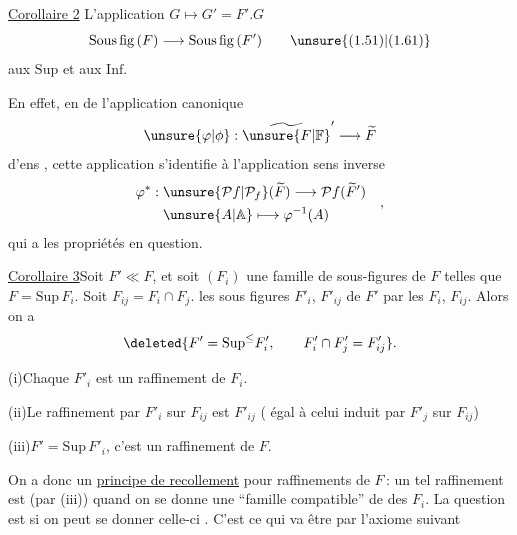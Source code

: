 \uline{Corollaire 2}\quad {} L'application $G\longmapsto G'=F'.G$
\[
\mathrm{Sous\,fig}\,(F)\longrightarrow\mathrm{Sous\,fig}\,(F')\tag*{\unsure{(1.51)|(1.61)}}
\]
 aux $\mathrm{Sup}$  et aux $\mathrm{Inf}$.

 En effet, en  de l'application
canonique 
\[
\unsure{\varphi|\phi}:\widetilde{\unsure{F|\mathbb F}}'\longrightarrow\widetilde F
\]
d'ens , cette application s'identifie
à l'application   sens inverse
\[
\begin{aligned}
\varphi^{*}:{}&\unsure{\mathcal{P}f|\mathcal{P}_{f}}(\widetilde F)\longrightarrow\mathcal{P}f(\widetilde F')\\
&\unsure{A|\mathbb A}\longmapsto\varphi^{-1}(A)
\end{aligned}
\quad,
\]
qui a les propriétés en question.

\uline{Corollaire 3}\quad Soit $F'\ll F$, et soit $(F_i)$ une
famille de sous-figures de $F$ telles que
$F=\mathrm{Sup}\,F_i$. Soit $F_{ij}=F_i\cap F_j$.  les
sous figures $F'_i$, $F'_{ij}$ de $F'$  par
les $F_i$, $F_{ij}$. Alors on a
\[
\deleted{F'=\mathrm{Sup}^{\leq}F'_i,\qquad F'_i\cap F'_j=F'_{ij}}.
\]

(i)\quad Chaque $F'_i$ est un raffinement de $F_i$.

(ii)\quad Le raffinement  par $F'_i$ sur $F_{ij}$ est $F'_{ij}$
( égal à celui induit par $F'_j$ sur $F_{ij}$)

(iii)\quad $F'=\mathrm{Sup}\,F'_i$,   c'est un
raffinement de $F$.

On a donc un \uline{principe de recollement}
pour  raffinements de $F$\,: un tel
raffinement est  (par (iii)) quand
on se donne une ``famille compatible''
de  des $F_i$. La question est
si on peut se donner celle-ci .
C'est ce qui va être 
par l'axiome suivant


